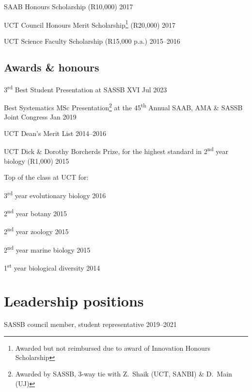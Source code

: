 \documentclass[10pt]{article}
\begin{document}
SAAB Honours Scholarship (R10,000)                                   \hfill 2017

UCT Council Honours Merit Scholarship\footnote{Awarded but not
  reimbursed due to award of Innovation Honours Scholarship}
  (R20,000)                                                          \hfill 2017

UCT Science Faculty Scholarship (R15,000 p.a.)                 \hfill 2015--2016

\subsection*{Awards \& honours}

3\textsuperscript{rd} Best Student Presentation at SASSB XVI     \hfill Jul 2023

Best Systematics MSc Presentation\footnote{Awarded by SASSB,
  3-way tie with Z.~Shaik (UCT, SANBI) \& D.~Main (UJ)}
  at the 45\textsuperscript{th}
  Annual SAAB, AMA \& SASSB Joint Congress                       \hfill Jan 2019

UCT Dean's Merit List                                          \hfill 2014--2016

UCT Dick \& Dorothy Borcherds Prize, for the highest standard in 
  2\textsuperscript{nd} year biology (R1,000)                        \hfill 2015

Top of the class at UCT for:

\hspace{2em} 3\textsuperscript{rd} year evolutionary biology         \hfill 2016

\hspace{2em} 2\textsuperscript{nd} year botany                       \hfill 2015 

\hspace{2em} 2\textsuperscript{nd} year zoology                      \hfill 2015

\hspace{2em} 2\textsuperscript{nd} year marine biology               \hfill 2015

\hspace{2em} 1\textsuperscript{st} year biological diversity         \hfill 2014

\section*{Leadership positions} %

SASSB council member, student representative                   \hfill 2019--2021
\end{document}
